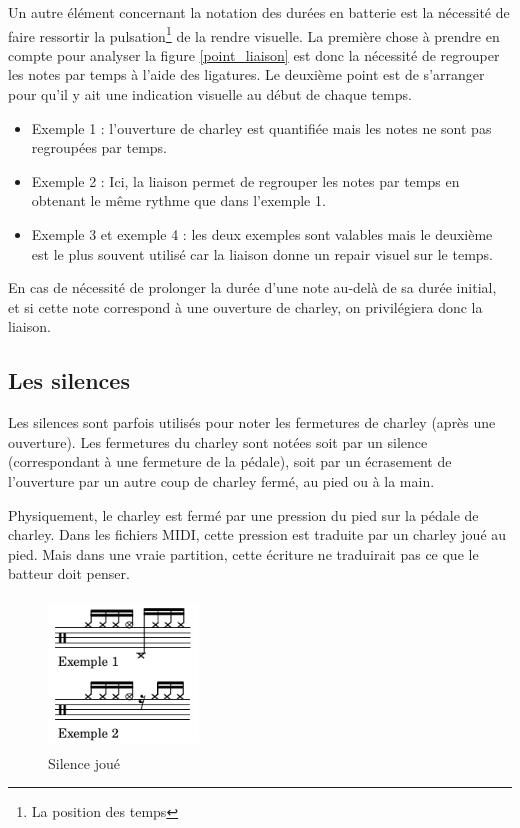 Un autre élément concernant la notation des durées en batterie est la nécessité
de faire ressortir la pulsation\footnote{La position des temps} de la rendre
visuelle. La première chose à prendre en compte pour analyser la figure
\ref{point_liaison} est donc la nécessité de regrouper les notes par temps à
l’aide des ligatures. Le deuxième point est de s’arranger pour qu’il y ait une
indication visuelle au début de chaque temps.

\begin{itemize}
    \item Exemple 1 : l’ouverture de charley est quantifiée mais les notes ne
        sont pas regroupées par temps.
    \item Exemple 2 : Ici, la liaison permet de regrouper les notes par temps
        en obtenant le même rythme que dans l’exemple 1.
    \item Exemple 3 et exemple 4 : les deux exemples sont valables mais le
        deuxième est le plus souvent utilisé car la liaison donne un repair
        visuel sur le temps.\\
\end{itemize}

En cas de nécessité de prolonger la durée d’une note au-delà 
de sa durée initial, et si cette note correspond à une ouverture de charley, on
privilégiera donc la liaison.

\subsection*{Les silences}
Les silences sont parfois utilisés pour noter les fermetures de charley (après
une ouverture). Les fermetures du charley sont notées soit par un silence
(correspondant à une fermeture de la pédale), soit par un écrasement de
l’ouverture par un autre coup de charley fermé, au pied ou à la main.

Physiquement, le charley est fermé par une pression du pied sur la pédale de
charley. Dans les fichiers MIDI, cette pression est traduite par un charley
joué au pied. Mais dans une vraie partition, cette écriture ne traduirait pas
ce que le batteur doit penser.

\begin{figure}[h]
	\centering
	\includegraphics[height=40mm, width=40mm]{z_images/3_methodes/0_notation_de_la_batterie/5_silence_joue.png}
	\caption{Silence joué}
	\label{silence joue}
\end{figure}

